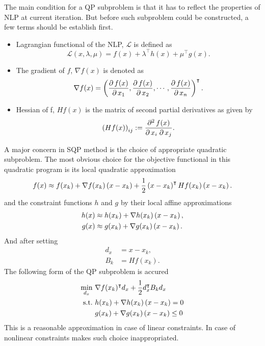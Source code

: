 The main condition for a QP subproblem is that it has to reflect the properties of NLP at current iteration. But before such subproblem could be constructed, a few terms should be establish first.
\begin{itemize}
	\item Lagrangian functional of the NLP, $\mathcal{L}$ is defined as\begin{equation}
		\mathcal{L}(x,\lambda,\mu) = f(x) + \lambda^\intercal h(x) + \mu^\intercal g(x). 
	\end{equation}
	\item The gradient of $f$, $\nabla f(x)$ is denoted as
	\begin{equation}
		\nabla f(x) = \left( \frac{\partial\, f(x)}{\partial\, x_1},\frac{\partial\, f(x)}{\partial\, x_2},\cdots,\frac{\partial\, f(x)}{\partial\, x_n} \right)^\intercal.
	\end{equation}
	\item Hessian of f, $Hf(x)$ is the matrix of second partial derivatives as given by
	\begin{equation}
		\left( Hf(x) \right)_{ij} := \frac{\partial^2\, f(x)}{\partial\, x_i\; \partial\, x_j}.
	\end{equation}
\end{itemize}
A major concern in SQP method is the choice of appropriate quadratic subproblem. 
The most obvious choice for the objective functional in this quadratic program is its local quadratic approximation
\begin{equation}
f(x)\approx f(x_k)+\nabla f(x_k)\left( x-x_k \right)+\frac{1}{2}\left( x-x_k \right)^\intercal Hf(x_k)\left( x-x_k \right).
\end{equation}
and the constraint functions $h$ and $g$ by their local affine approximations
\begin{subequations}
	\begin{align}
		h(x)&\approx h(x_k)+\nabla h(x_k)\left( x-x_k \right),\\
		g(x)&\approx g(x_k)+\nabla g(x_k)\left( x-x_k \right).	
	\end{align}
\end{subequations}
And after setting 
\begin{subequations}
	\begin{align}
		d_x&=x-x_k,\\
		B_k &= Hf(x_k).
	\end{align}
\end{subequations}
The following form of the QP subproblem is accured
\begin{subequations}
	\begin{align}
		\min_{d_x}\  &\nabla f(x_k)^\intercal d_x+\frac{1}{2}d_x^\intercal B_k d_x\\
		\text{s.t.}\  &h(x_k)+\nabla h(x_k)\left( x-x_k \right) = 0\\
		&g(x_k)+\nabla g(x_k)\left( x-x_k \right)\leq 0
	\end{align}
\end{subequations}
This is a reasonable approximation in case of linear constraints. In case of nonlinear constraints makes such choice inappropriated. 

